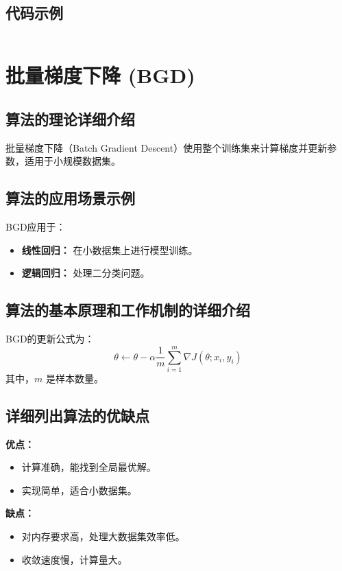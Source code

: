 \subsection*{代码示例}
\begin{lstlisting}

\end{lstlisting}


\section{批量梯度下降 (BGD)}
\subsection*{算法的理论详细介绍}
批量梯度下降（Batch Gradient Descent）使用整个训练集来计算梯度并更新参数，适用于小规模数据集。

\subsection*{算法的应用场景示例}
BGD应用于：
\begin{itemize}
    \item \textbf{线性回归：} 在小数据集上进行模型训练。
    \item \textbf{逻辑回归：} 处理二分类问题。
\end{itemize}

\subsection*{算法的基本原理和工作机制的详细介绍}
BGD的更新公式为：
\[
    \theta \leftarrow \theta - \alpha \frac{1}{m} \sum_{i=1}^{m} \nabla J(\theta; x_i, y_i)
\]
其中，\(m\) 是样本数量。

\subsection*{详细列出算法的优缺点}
\textbf{优点：}
\begin{itemize}
    \item 计算准确，能找到全局最优解。
    \item 实现简单，适合小数据集。
\end{itemize}

\textbf{缺点：}
\begin{itemize}
    \item 对内存要求高，处理大数据集效率低。
    \item 收敛速度慢，计算量大。
\end{itemize}

